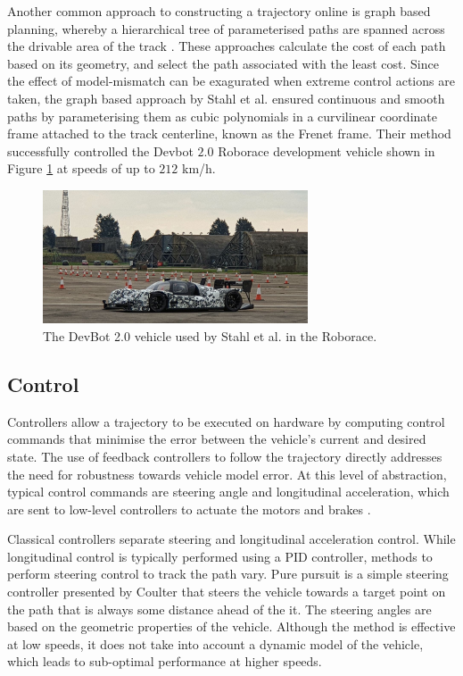 Another common approach to constructing a trajectory online is graph based planning, whereby a hierarchical tree of parameterised paths are spanned across the drivable area of the track \cite{Stahl2019, Werling2010, Li2017}.
These approaches calculate the cost of each path based on its geometry, and select the path associated with the least cost.
Since the effect of model-mismatch can be exagurated when extreme control actions are taken, the graph based approach by Stahl et al. \cite{Stahl2019} ensured continuous and smooth paths by parameterising them as cubic polynomials in a curvilinear coordinate frame attached to the track centerline, known as the Frenet frame.
Their method successfully controlled the Devbot $2.0$ Roborace development vehicle shown in Figure \ref{fig:Devbot2} at speeds of up to $212$ km/h.

\begin{figure}[htb!]
    \centering
    \includegraphics[width=0.7\textwidth]{contents/chapt2/figs/devbot.PNG}
    \caption[The DevBot 2.0 Roborace vehicle]{The DevBot 2.0 vehicle used by Stahl et al. \cite{Stahl2019} in the Roborace. }
    \label{fig:Devbot2}
\end{figure}


\subsection{Control}\label{sec:control}

Controllers allow a trajectory to be executed on hardware by computing control commands that minimise the error between the vehicle's current and desired state.
The use of feedback controllers to follow the trajectory directly addresses the need for robustness towards vehicle model error.
At this level of abstraction, typical control commands are steering angle and longitudinal acceleration, which are sent to low-level controllers to actuate the motors and brakes \cite{Betz2021}.

Classical controllers separate steering and longitudinal acceleration control. 
While longitudinal control is typically performed using a PID controller, methods to perform steering control to track the path vary.
Pure pursuit is a simple steering controller presented by Coulter \cite{Coulter_1992} that steers the vehicle towards a target point on the path that is always some distance ahead of the it.
The steering angles are based on the geometric properties of the vehicle.
Although the method is effective at low speeds, it does not take into account a dynamic model of the vehicle, which leads to sub-optimal performance at higher speeds.

